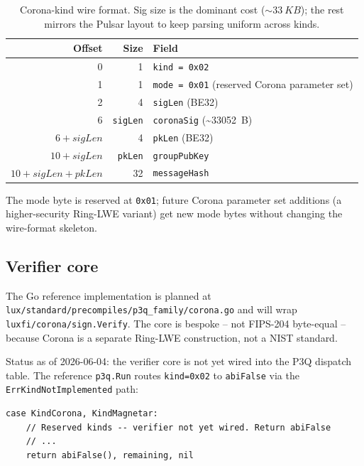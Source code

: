 \begin{table}[h]
\centering
\small
\begin{tabular}{@{}rrl@{}}
\toprule
\textbf{Offset} & \textbf{Size} & \textbf{Field} \\
\midrule
0 & 1 & \texttt{kind = 0x02} \\
1 & 1 & \texttt{mode = 0x01} (reserved Corona parameter set) \\
2 & 4 & \texttt{sigLen} (BE32) \\
6 & \texttt{sigLen} & \texttt{coronaSig} (\textasciitilde\SI{33052}{B}) \\
$6{+}\textit{sigLen}$ & 4 & \texttt{pkLen} (BE32) \\
$10{+}\textit{sigLen}$ & \texttt{pkLen} & \texttt{groupPubKey} \\
$10{+}\textit{sigLen}{+}\textit{pkLen}$ & 32 & \texttt{messageHash} \\
\bottomrule
\end{tabular}
\caption{Corona-kind wire format. Sig size is the dominant cost
($\sim\SI{33}{KB}$); the rest mirrors the Pulsar layout to keep
parsing uniform across kinds.}
\label{tab:corona-wire}
\end{table}

The mode byte is reserved at \texttt{0x01}; future Corona
parameter set additions (a higher-security Ring-LWE variant) get
new mode bytes without changing the wire-format skeleton.

\subsection{Verifier core}

The Go reference implementation is planned at
\texttt{lux/standard/precompiles/p3q\_family/corona.go} and
will wrap \texttt{luxfi/corona/sign.Verify}. The core is bespoke
-- not FIPS-204 byte-equal -- because Corona is a separate
Ring-LWE construction, not a NIST standard.

Status as of 2026-06-04: the verifier core is not yet wired into
the P3Q dispatch table. The reference \texttt{p3q.Run} routes
\texttt{kind=0x02} to \texttt{abiFalse} via the
\texttt{ErrKindNotImplemented} path:

\begin{lstlisting}[language={}]
case KindCorona, KindMagnetar:
    // Reserved kinds -- verifier not yet wired. Return abiFalse
    // ...
    return abiFalse(), remaining, nil
\end{lstlisting}

